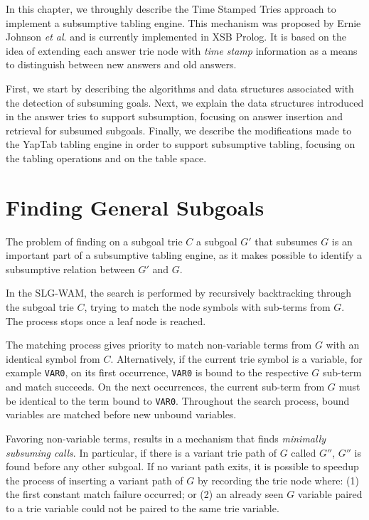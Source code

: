 In this chapter, we throughly describe the Time Stamped Tries approach
to implement a subsumptive tabling engine. This mechanism was proposed by
Ernie Johnson \textit{et al}. \cite{Johnson-99} and is currently implemented in XSB Prolog.
It is based on the idea of extending each answer trie node with \textit{time stamp}
information as a means to distinguish between new answers and old answers.

First, we start by describing the algorithms and data structures associated
with the detection of subsuming goals. Next, we explain the data structures
introduced in the answer tries to support subsumption, focusing on answer insertion
and retrieval for subsumed subgoals. Finally, we describe the modifications made to the YapTab
tabling engine in order to support subsumptive tabling, focusing on the tabling operations
and on the table space.

\section{Finding General Subgoals}\label{sec:lookup_subsuming}

The problem of finding on a subgoal trie $C$ a subgoal $G'$ that subsumes $G$ 
is an important part of a subsumptive tabling engine, as it makes possible to
identify a subsumptive relation between $G'$ and $G$.

In the SLG-WAM, the search is performed by recursively backtracking through the subgoal trie $C$, trying
to match the node symbols with sub-terms from $G$. The process stops once a leaf node is reached.

The matching process gives priority to match non-variable terms from $G$
with an identical symbol from $C$.
Alternatively, if the current trie symbol is a variable, for example \texttt{VAR0}, on its first occurrence, \texttt{VAR0}
is bound to the respective $G$ sub-term
and match succeeds. On the next occurrences, the current sub-term from $G$ must
be identical to the term bound to \texttt{VAR0}. Throughout the search process, bound variables are
matched before new unbound variables.

Favoring non-variable terms, results in a mechanism that finds \textit{minimally subsuming calls}.
In particular, if there is a variant trie path of $G$ called $G''$, $G''$ is found before any other subgoal.
If no variant path exits, it is possible to speedup the process of inserting a variant path of $G$
by recording the trie node where: (1) the first constant match
failure occurred; or (2) an already seen $G$ variable paired to a trie variable could
not be paired to the same trie variable.

